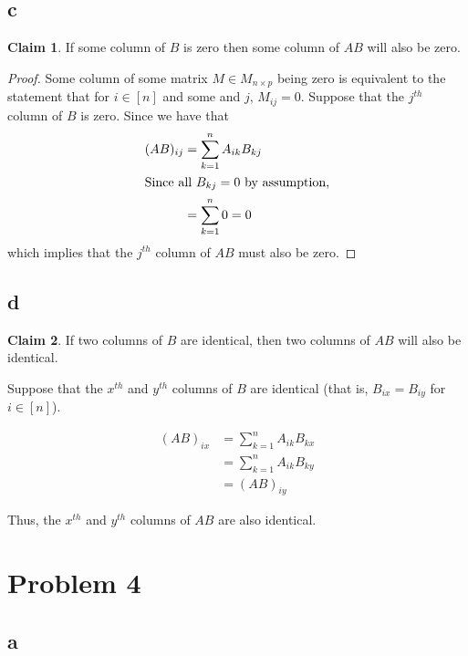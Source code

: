 \documentclass[12pt,letterpaper]{article}
\theoremstyle{definition}
\newtheorem*{claim}{Claim}
\begin{document}
\subsection*{c}

\begin{claim}
  If some column of $B$ is zero then some column of $AB$ will also be zero.
\end{claim}

\begin{proof}
  Some column of some matrix $M \in M_{n \times p}$ being zero is equivalent to the statement that
  for $i \in [n]$ and some and $j$, $M_{ij} = 0$. Suppose that the $j^{th}$ column of $B$ is zero.
  Since we have that
  \begin{align*}
    (AB)_{ij} &= \sum_{k=1}^nA_{ik}B_{kj} \\
    \intertext{Since all $B_{kj} = 0$ by assumption,}
              &= \sum_{k=1}^n0 = 0
  \end{align*}
  which implies that the $j^{th}$ column of $AB$ must also be zero.
\end{proof}

\subsection*{d}

\begin{claim}
  If two columns of $B$ are identical, then two columns of $AB$ will also be identical.
\end{claim}

Suppose that the $x^{th}$ and $y^{th}$ columns of $B$ are identical (that is,
$B_{ix} =B_{iy}$ for $i \in [n]$).

\begin{align*}
  (AB)_{ix} &= \sum_{k=1}^nA_{ik}B_{kx} \\
            &= \sum_{k=1}^nA_{ik}B_{ky} \\
            &= (AB)_{iy}
\end{align*}

Thus, the $x^{th}$ and $y^{th}$ columns of $AB$ are also identical.

\section*{Problem 4}

\subsection*{a}
\end{document}

